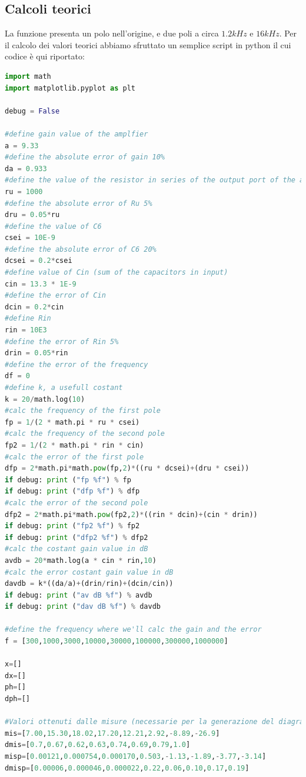\documentclass{article}
\begin{document}
\subsection{Calcoli teorici}
La funzione presenta un polo nell'origine, e due poli a circa $1.2kHz$ e $16kHz$.
Per il calcolo dei valori teorici abbiamo sfruttato un semplice script in python il cui codice è qui riportato:
\begin{lstlisting}[language=Python, breaklines=true]
import math
import matplotlib.pyplot as plt

debug = False

#define gain value of the amplfier
a = 9.33
#define the absolute error of gain 10%
da = 0.933
#define the value of the resistor in series of the output port of the amplifier
ru = 1000
#define the absolute error of Ru 5%
dru = 0.05*ru
#define the value of C6
csei = 10E-9
#define the absolute error of C6 20%
dcsei = 0.2*csei
#define value of Cin (sum of the capacitors in input)
cin = 13.3 * 1E-9
#define the error of Cin
dcin = 0.2*cin
#define Rin
rin = 10E3
#define the error of Rin 5%
drin = 0.05*rin
#define the error of the frequency
df = 0
#define k, a usefull costant
k = 20/math.log(10)
#calc the frequency of the first pole
fp = 1/(2 * math.pi * ru * csei)
#calc the frequency of the second pole
fp2 = 1/(2 * math.pi * rin * cin)
#calc the error of the first pole
dfp = 2*math.pi*math.pow(fp,2)*((ru * dcsei)+(dru * csei))
if debug: print ("fp %f") % fp
if debug: print ("dfp %f") % dfp
#calc the error of the second pole
dfp2 = 2*math.pi*math.pow(fp2,2)*((rin * dcin)+(cin * drin))
if debug: print ("fp2 %f") % fp2
if debug: print ("dfp2 %f") % dfp2
#calc the costant gain value in dB
avdb = 20*math.log(a * cin * rin,10)
#calc the error costant gain value in dB
davdb = k*((da/a)+(drin/rin)+(dcin/cin))
if debug: print ("av dB %f") % avdb
if debug: print ("dav dB %f") % davdb

#define the frequency where we'll calc the gain and the error
f = [300,1000,3000,10000,30000,100000,300000,1000000]

x=[]
dx=[]
ph=[]
dph=[]

#Valori ottenuti dalle misure (necessarie per la generazione del diagramma di bode)
mis=[7.00,15.30,18.02,17.20,12.21,2.92,-8.89,-26.9]
dmis=[0.7,0.67,0.62,0.63,0.74,0.69,0.79,1.0]
misp=[0.00121,0.000754,0.000170,0.503,-1.13,-1.89,-3.77,-3.14]
dmisp=[0.00006,0.000046,0.000022,0.22,0.06,0.10,0.17,0.19]


\end{lstlisting}
\end{document}
